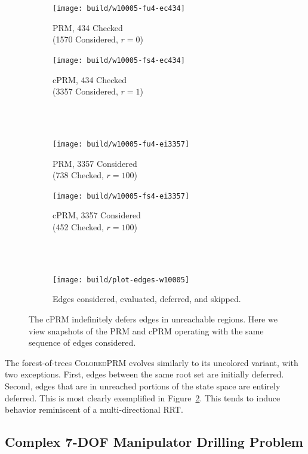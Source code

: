 \documentclass{report}
\begin{document}
\begin{figure}[t]
\centering
\begin{subfigure}[b]{.49\linewidth}
\centering
\texttt{[image: build/w10005-fu4-ec434]}
\caption{PRM, 434 Checked\\(1570 Considered, $r=0$)}
\end{subfigure}
\begin{subfigure}[b]{.49\linewidth}
\centering
\texttt{[image: build/w10005-fs4-ec434]}
\caption{cPRM, 434 Checked\\(3357 Considered, $r=1$)}
\end{subfigure}
\\ \quad \\
\begin{subfigure}[b]{.49\linewidth}
\centering
\texttt{[image: build/w10005-fu4-ei3357]}
\caption{PRM, 3357 Considered\\(738 Checked, $r=100$)}
\end{subfigure}
\begin{subfigure}[b]{.49\linewidth}
\centering
\texttt{[image: build/w10005-fs4-ei3357]}
\caption{cPRM, 3357 Considered\\(452 Checked, $r=100$)}
\end{subfigure}
\\ \quad \\
\begin{subfigure}[b]{\linewidth}
\centering
\texttt{[image: build/plot-edges-w10005]}
\caption{Edges considered, evaluated, deferred, and skipped.}
\label{subfig:results}
\end{subfigure}
\caption{The cPRM indefinitely defers edges in unreachable regions.
Here we view snapshots of the PRM and cPRM operating with the same sequence
of edges considered.}
\label{fig:unreachable}
\end{figure}

The forest-of-trees \textsc{ColoredPRM}
evolves similarly to its uncolored variant,
with two exceptions.
First, edges between the same root set are initially deferred.
Second, edges that are in unreached portions of the state space
are entirely deferred.
This is most clearly exemplified in Figure~\ref{fig:unreachable}.
This tends to induce behavior reminiscent of a multi-directional RRT.

\subsection{Complex 7-DOF Manipulator Drilling Problem}
\end{document}
